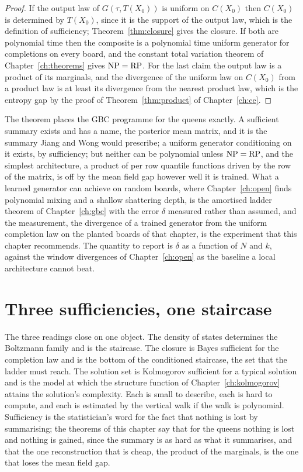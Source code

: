 \begin{proof}
If the output law of $G(\tau, T(X_0))$ is uniform on $C(X_0)$ then $C(X_0)$ is determined by $T(X_0)$, since it is the support of the output law, which is the definition of sufficiency; Theorem~\ref{thm:closure} gives the closure. If both are polynomial time then the composite is a polynomial time uniform generator for completions on every board, and the constant total variation theorem of Chapter~\ref{ch:theorems} gives $\mathrm{NP} = \mathrm{RP}$. For the last claim the output law is a product of its marginals, and the divergence of the uniform law on $C(X_0)$ from a product law is at least its divergence from the nearest product law, which is the entropy gap by the proof of Theorem~\ref{thm:product} of Chapter~\ref{ch:ce}.
\end{proof}

The theorem places the GBC programme for the queens exactly. A sufficient summary exists and has a name, the posterior mean matrix, and it is the summary Jiang and Wong would prescribe; a uniform generator conditioning on it exists, by sufficiency; but neither can be polynomial unless $\mathrm{NP} = \mathrm{RP}$, and the simplest architecture, a product of per row quantile functions driven by the row of the matrix, is off by the mean field gap however well it is trained. What a learned generator can achieve on random boards, where Chapter~\ref{ch:open} finds polynomial mixing and a shallow shattering depth, is the amortised ladder theorem of Chapter~\ref{ch:gbc} with the error $\delta$ measured rather than assumed, and the measurement, the divergence of a trained generator from the uniform completion law on the planted boards of that chapter, is the experiment that this chapter recommends. The quantity to report is $\delta$ as a function of $N$ and $k$, against the window divergences of Chapter~\ref{ch:open} as the baseline a local architecture cannot beat.

\section{Three sufficiencies, one staircase}

The three readings close on one object. The density of states determines the Boltzmann family and is the staircase. The closure is Bayes sufficient for the completion law and is the bottom of the conditioned staircase, the set that the ladder must reach. The solution set is Kolmogorov sufficient for a typical solution and is the model at which the structure function of Chapter~\ref{ch:kolmogorov} attains the solution's complexity. Each is small to describe, each is hard to compute, and each is estimated by the vertical walk if the walk is polynomial. Sufficiency is the statistician's word for the fact that nothing is lost by summarising; the theorems of this chapter say that for the queens nothing is lost and nothing is gained, since the summary is as hard as what it summarises, and that the one reconstruction that is cheap, the product of the marginals, is the one that loses the mean field gap.

